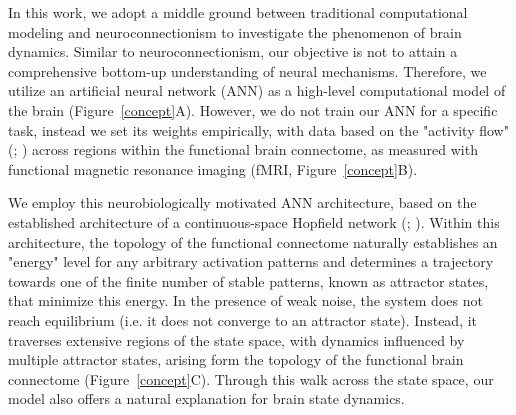 \documentclass{article}
\begin{document}
In this work, we adopt a middle ground between traditional computational modeling and neuroconnectionism to investigate
the phenomenon of brain dynamics.
Similar to neuroconnectionism, our objective is not to attain a comprehensive bottom-up understanding of neural
mechanisms. Therefore, we utilize an artificial neural network (ANN) as a high-level computational model of the
brain (Figure~\ref{concept}A).
However, we do not train our ANN for a specific task, instead we set its weights empirically, with data based
on the "activity flow" (\cite{Cole_2016}; \cite{Ito_2017})
across regions within the functional brain connectome, as measured with functional magnetic resonance imaging
(fMRI, Figure~\ref{concept}B).

We employ this neurobiologically motivated ANN architecture, based on the established architecture of a continuous-space
Hopfield network (\href{https://doi.org/10.1073/pnas.79.8.2554}{}; \href{https://doi.org/10.1038/s42254-023-00595-y}{}).
Within this architecture, the topology of the functional connectome naturally establishes an "energy" level for any
arbitrary activation patterns and determines a trajectory towards one of the finite number of stable patterns, known as
attractor states, that minimize this energy.
In the presence of weak noise, the system does not reach equilibrium (i.e. it does not converge to an attractor state).
Instead, it traverses extensive regions of the state space, with dynamics influenced by multiple attractor states,
arising form the topology of the functional brain connectome (Figure~\ref{concept}C).
Through this walk across the state space, our model also offers a natural explanation for brain state dynamics.
\end{document}
